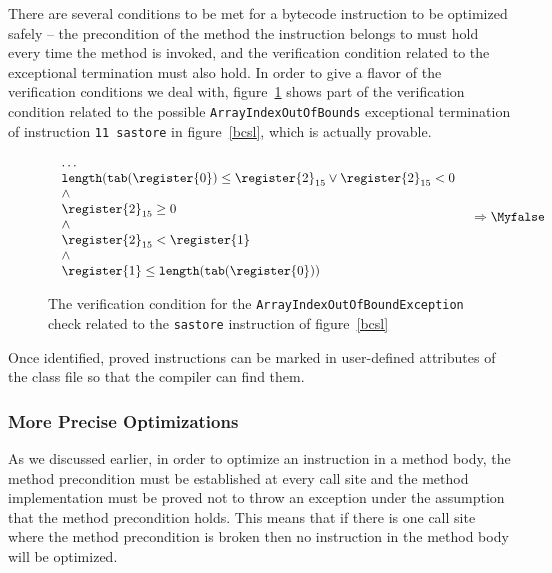 There are several conditions to be met for a bytecode instruction to be optimized safely -- the precondition of the method the instruction belongs to must hold every time the method is invoked, and the verification condition related to the exceptional termination must also hold. In order to give a flavor of the verification conditions we deal with, figure~\ref{proofs:vc} shows part of the  verification condition related to the possible \texttt{ArrayIndexOutOfBounds} exceptional termination of instruction \verb!11 sastore! in figure~\ref{bcsl}, which is actually provable.

\begin{figure}
\[
  \begin{array}{ll}
    \begin{array}{l}
        \ldots \\
     \texttt{length} ( \texttt{tab}(  \register{0}) \leq \register{2}_{15} \vee \register{2}_{15}< 0   \\
       \wedge \\
        \register{2}_{15 } \geq 0 \\
	\wedge \\
       \register{2}_{15 }< \register{1} \\
       \wedge \\
        \register{1} \leq  \texttt{length} ( \texttt{tab}( \register{0} ) ) \\
        \end{array}
     &  \Rightarrow  \Myfalse
  \end{array}\]
\caption{The verification condition for the \texttt{ArrayIndexOutOfBoundException} check related to the \texttt{sastore} instruction of figure~\ref{bcsl}}
\label{proofs:vc}
\end{figure}

Once identified, proved instructions can be marked in user-defined attributes of the class file so that the compiler can find them.

\subsubsection{More Precise Optimizations}

\label{section:optimprecise}

As we discussed earlier, in order to optimize an instruction in a method body, the method precondition must be established at every call site and the method implementation must be proved not to throw an exception under the assumption that the method precondition holds. This means that if there is one call site where the method precondition is broken then no instruction in the method body will be optimized.

